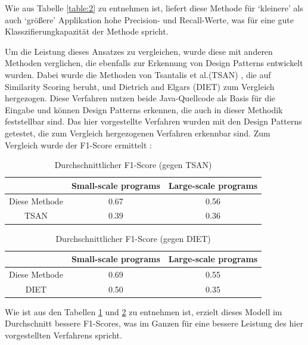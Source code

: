 \documentclass[conference]{IEEEtran}
\begin{document}
Wie aus Tabelle \ref{table:2} zu entnehmen ist, liefert diese Methode für `kleinere' als auch `größere' Applikation hohe Precision- und Recall-Werte, was für eine gute Klasszifierungkapazität der Methode spricht.

Um die Leistung dieses Ansatzes zu vergleichen, wurde diese mit anderen Methoden verglichen, die ebenfalls zur Erkennung von Design Patterns entwickelt wurden.
Dabei wurde die Methoden von Tsantalis et al.(TSAN) \cite{4015512}, die auf Similarity Scoring beruht, und Dietrich and Elgars (DIET)\cite{DIETRICH2007108} zum Vergleich hergezogen. Diese Verfahren nutzen beide Java-Quellcode als Basis für die Eingabe und können Design Patterns erkennen, die auch in dieser Methodik feststellbar sind.
Das hier vorgestellte Verfahren wurden mit den Design Patterns getestet, die zum Vergleich hergezogenen Verfahren erkennbar sind. Zum Vergleich wurde der F1-Score ermittelt \cite[p. 9]{dodmetrics}:

\begin{table}[h]
    \centering
    \caption{Durchschnittlicher F1-Score (gegen TSAN)}
    \label{table:3}
    \begin{tabular}{|c|c|c|}
        \hline
                      & Small-scale programs & Large-scale programs \\
        \hline
        Diese Methode & 0.67                 & 0.56                 \\
        \hline
        TSAN          & 0.39                 & 0.36                 \\
        \hline
    \end{tabular}
\end{table}

\begin{table}[h]
    \centering
    \caption{Durchschnittlicher F1-Score (gegen DIET)}
    \label{table:4}
    \begin{tabular}{|c|c|c|}
        \hline
                      & Small-scale programs & Large-scale programs \\
        \hline
        Diese Methode & 0.69                 & 0.55                 \\
        \hline
        DIET          & 0.50                 & 0.35                 \\
        \hline
    \end{tabular}
\end{table}

Wie ist aus den Tabellen \ref{table:3} und \ref{table:4} zu entnehmen ist, erzielt dieses Modell im Durchschnitt bessere F1-Scores, was im Ganzen für eine bessere Leistung des hier vorgestellten Verfahrens spricht.
\end{document}
